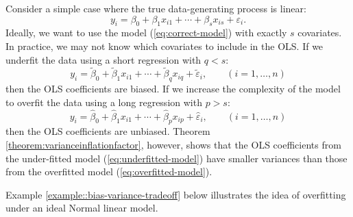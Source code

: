 Consider a simple case where the true data-generating process is linear:
\begin{equation}
y_{i}=\beta_{0}+\beta_{1}x_{i1}+\cdots+\beta_{s}x_{is}+\varepsilon_{i} . \label{eq:correct-model}
\end{equation}
Ideally, we want
to use the model (\ref{eq:correct-model}) with exactly $s$ covariates. In practice, we may not know which covariates to include in the OLS. 
If we underfit the data using a short regression with $q<s$: 
\begin{equation}
y_{i}=\tilde{\beta}_0+\tilde{\beta}_{1}x_{i1}+\cdots+\tilde{\beta}_{q}x_{iq}+\tilde{\varepsilon}_{i},\qquad(i=1,\ldots,n)\label{eq:underfitted-model}
\end{equation}
then the OLS coefficients are biased. If we increase the complexity of
the model to overfit the data using a long regression with $p>s$: 
\begin{equation}
y_{i}=\hat{\beta}_0 +\hat{\beta}_{1}x_{i1}+\cdots+\hat{\beta}_{p}x_{ip}+\hat{\varepsilon}_{i},\qquad(i=1,\ldots,n)\label{eq:overfitted-model}
\end{equation}
then the OLS coefficients are unbiased. Theorem \ref{theorem:varianceinflationfactor},
however, shows that the OLS coefficients from the under-fitted model
(\ref{eq:underfitted-model}) have smaller variances than those from
the overfitted model (\ref{eq:overfitted-model}). 



Example \ref{example::bias-variance-tradeoff} below illustrates the idea of overfitting under an ideal Normal linear model. 


